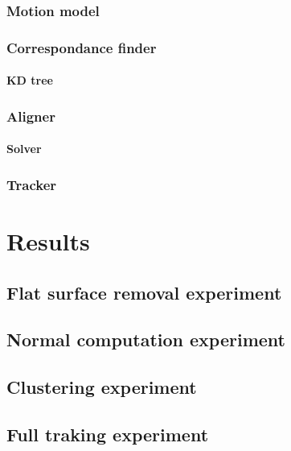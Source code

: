 \subsection{Motion model}
\subsection{Correspondance finder}
  \subsubsection{KD tree}

\subsection{Aligner}
  \subsubsection{Solver}
\subsection{Tracker}




\chapter{Results}

\section{Flat surface removal experiment}
\section{Normal computation experiment}
\section{Clustering experiment}
\section{Full traking experiment}



